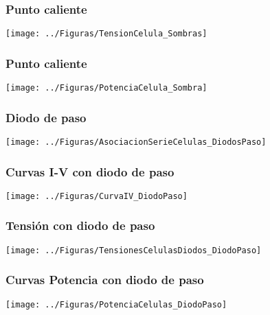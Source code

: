 \documentclass[xcolor=dvipsnames]{beamer}
\begin{document}
\begin{frame}
  \frametitle{Punto caliente}

  \begin{center}
    \texttt{[image: ../Figuras/TensionCelula\_Sombras]}
    \par\end{center}


\end{frame}

\begin{frame}
  \frametitle{Punto caliente}

  \begin{center}
    \texttt{[image: ../Figuras/PotenciaCelula\_Sombra]}
    \par\end{center}


\end{frame}

\begin{frame}
  \frametitle{Diodo de paso}

  \begin{center}
    \texttt{[image: ../Figuras/AsociacionSerieCelulas\_DiodosPaso]}
    \par\end{center}


\end{frame}

\begin{frame}
  \frametitle{Curvas I-V con diodo de paso}

  \begin{center}
    \texttt{[image: ../Figuras/CurvaIV\_DiodoPaso]}
    \par\end{center}


\end{frame}

\begin{frame}
  \frametitle{Tensión con diodo de paso}

  \begin{center}
    \texttt{[image: ../Figuras/TensionesCelulasDiodos\_DiodoPaso]}
    \par\end{center}


\end{frame}

\begin{frame}
  \frametitle{Curvas Potencia con diodo de paso}

  \begin{center}
    \texttt{[image: ../Figuras/PotenciaCelulas\_DiodoPaso]}
    \par\end{center}


\end{frame}
\end{document}
